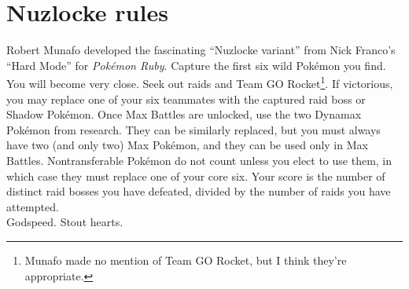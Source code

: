 \section{Nuzlocke rules}
Robert Munafo developed the fascinating ``Nuzlocke variant'' from Nick Franco's ``Hard Mode''
 for \textit{Pokémon Ruby}.
Capture the first six wild Pokémon you find.
You will become very close.
Seek out raids and Team GO Rocket\footnote{Munafo made no mention of Team GO Rocket, but I think they're appropriate.}.
If victorious, you may replace one of your six teammates with the captured raid boss or Shadow Pokémon.
Once Max Battles are unlocked, use the two Dynamax Pokémon from research.
They can be similarly replaced, but you must always have two (and only two) Max Pokémon, and they can be used only in Max Battles.
Nontransferable Pokémon do not count unless you elect to use them, in which case they
 must replace one of your core six.
Your score is the number of distinct raid bosses you have defeated, divided by the number of raids you have attempted.
\\
Godspeed. Stout hearts.
